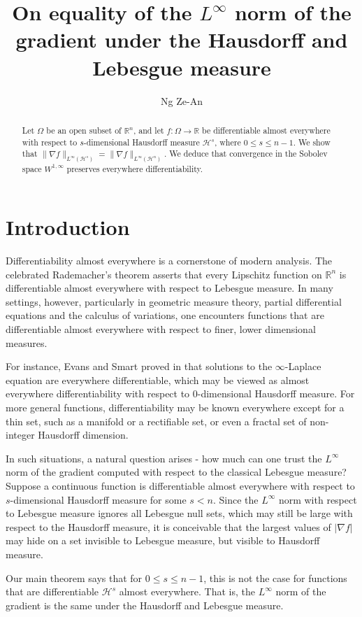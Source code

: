 \documentclass{article}
\title{On equality of the $L^\infty$ norm of the gradient under the Hausdorff and Lebesgue measure}
\author{Ng Ze-An}
\date{}
\begin{document}
\maketitle
\begin{abstract}
    Let $\Omega$ be an open subset of $\mathbb R^n$, and let $f: \Omega \to \mathbb R$ be differentiable almost everywhere with respect to $s$-dimensional Hausdorff measure $\mathcal H^s$, where $0 \leq s \leq n-1$. We show that $\|\nabla f\|_{L^\infty (\mathcal H^s)} = \|\nabla f\|_{L^\infty(\mathcal H^n)}.$ We deduce that convergence in the Sobolev space $W^{1, \infty}$ preserves everywhere differentiability.
\end{abstract}


\section{Introduction}
Differentiability almost everywhere is a cornerstone of modern analysis. The celebrated Rademacher's theorem asserts that every Lipschitz function on $\mathbb R^n$ is differentiable almost everywhere with respect to Lebesgue measure. In many settings, however, particularly in geometric measure theory, partial differential equations and the calculus of variations, one encounters functions that are differentiable almost everywhere with respect to finer, lower dimensional measures. 

For instance, Evans and Smart proved in \cite{evanssmart} that solutions to the $\infty$-Laplace equation are everywhere differentiable, which may be viewed as almost everywhere differentiability with respect to $0$-dimensional Hausdorff measure. For more general functions, differentiability may be known everywhere except for a thin set, such as a manifold or a rectifiable set, or even a fractal set of non-integer Hausdorff dimension.

In such situations, a natural question arises - how much can one trust the $L^\infty$ norm of the gradient computed with respect to the classical Lebesgue measure? Suppose a continuous function is differentiable almost everywhere with respect to $s$-dimensional Hausdorff measure for some $s < n$. Since the $L^\infty$ norm with respect to Lebesgue measure ignores all Lebesgue null sets, which may still be large with respect to the Hausdorff measure, it is conceivable that the largest values of $|\nabla f|$ may hide on a set invisible to Lebesgue measure, but visible to Hausdorff measure. 

Our main theorem says that for $0 \leq s \leq n-1$, this is not the case for functions that are differentiable $\mathcal H^s$ almost everywhere. That is, the $L^\infty$ norm of the gradient is the same under the Hausdorff and Lebesgue measure.
\end{document}
